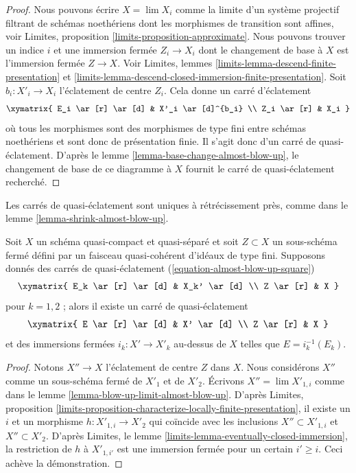 \begin{proof}
Nous pouvons écrire $X = \lim X_i$ comme la limite d'un système projectif filtrant
de schémas noethériens dont les morphismes de transition sont affines, voir
Limites, proposition \ref{limits-proposition-approximate}.
Nous pouvons trouver un indice $i$ et une immersion fermée $Z_i \to X_i$
dont le changement de base à $X$ est l'immersion fermée $Z \to X$.
Voir Limites, lemmes \ref{limits-lemma-descend-finite-presentation} et
\ref{limits-lemma-descend-closed-immersion-finite-presentation}.
Soit $b_i : X'_i \to X_i$ l'éclatement de centre $Z_i$.
Cela donne un carré d'éclatement
$$
\xymatrix{
E_i \ar[r] \ar[d] & X'_i \ar[d]^{b_i} \\
Z_i \ar[r] & X_i
}
$$
où tous les morphismes sont des morphismes de type fini entre schémas noethériens
et sont donc de présentation finie. Il s'agit donc d'un carré de quasi-éclatement.
D'après le lemme \ref{lemma-base-change-almost-blow-up},
le changement de base de ce diagramme à $X$ fournit le
carré de quasi-éclatement recherché.
\end{proof}

\noindent
Les carrés de quasi-éclatement sont uniques à rétrécissement près, comme dans le
lemme \ref{lemma-shrink-almost-blow-up}.

\begin{lemma}
\label{lemma-almost-blow-up-unique}
Soit $X$ un schéma quasi-compact et quasi-séparé et soit $Z \subset X$
un sous-schéma fermé défini par un faisceau quasi-cohérent d'idéaux de type fini.
Supposons donnés des carrés de quasi-éclatement (\ref{equation-almost-blow-up-square})
$$
\xymatrix{
E_k \ar[r] \ar[d] & X_k' \ar[d] \\
Z \ar[r] & X
}
$$
pour $k = 1, 2$ ; alors il existe un carré de quasi-éclatement
$$
\xymatrix{
E \ar[r] \ar[d] & X' \ar[d] \\
Z \ar[r] & X
}
$$
et des immersions fermées $i_k : X' \to X'_k$ au-dessus de $X$
telles que $E = i_k^{-1}(E_k)$.
\end{lemma}

\begin{proof}
Notons $X'' \to X$ l'éclatement de centre $Z$ dans $X$.
Nous considérons $X''$ comme un sous-schéma fermé de $X'_1$ et de $X'_2$.
Écrivons $X'' = \lim X'_{1, i}$ comme dans le
lemme \ref{lemma-blow-up-limit-almost-blow-up}.
D'après Limites, proposition
\ref{limits-proposition-characterize-locally-finite-presentation},
il existe un $i$ et un morphisme $h : X'_{1, i} \to X'_2$ qui coïncide
avec les inclusions $X'' \subset X'_{1, i}$ et $X'' \subset X'_2$.
D'après Limites, le lemme \ref{limits-lemma-eventually-closed-immersion},
la restriction de $h$ à $X'_{1, i'}$ est une immersion fermée
pour un certain $i' \geq i$. Ceci achève la démonstration.
\end{proof}

